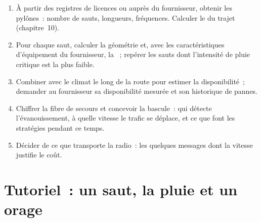 \label{lst:nw:long-haul-wireless:storm}

\begin{method}\label{met:nw:long-haul-wireless:eval}
\begin{enumerate}
\item À partir des registres de licences ou auprès du fournisseur, obtenir les pylônes~: nombre de sauts, longueurs, fréquences. Calculer le  du
  trajet (chapitre~10).
\item Pour chaque saut, calculer la géométrie et, avec les caractéristiques d'équipement du fournisseur, la ~; repérer les sauts dont l'intensité
  de pluie critique est la plus faible.
\item Combiner avec le climat le long de la route pour estimer la disponibilité~; demander au fournisseur sa disponibilité mesurée et son historique de pannes.
\item Chiffrer la fibre de secours et concevoir la bascule~: qui détecte l'évanouissement, à quelle vitesse le trafic se déplace, et ce que font les stratégies pendant ce temps.
\item Décider de ce que transporte la radio~: les quelques messages dont la vitesse justifie le coût.
\end{enumerate}
\end{method}

\section{Tutoriel~: un saut, la pluie et un orage}\label{tut:nw:long-haul-wireless:tut}

